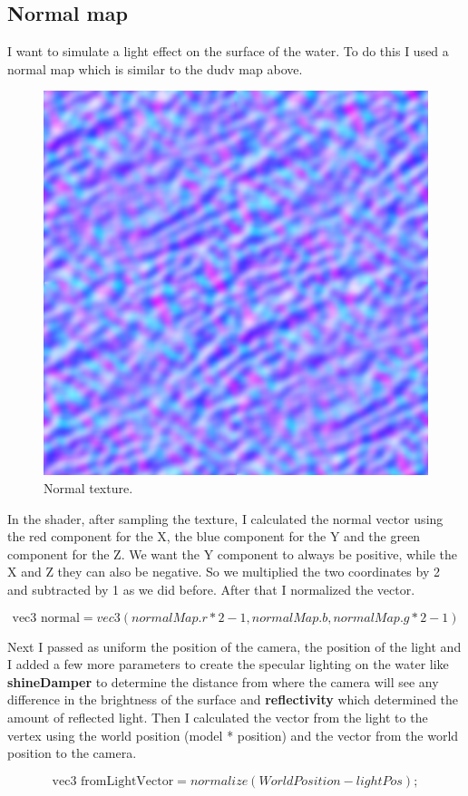 \subsection{Normal map}
I want to simulate a light effect on the surface of the water. To do this I used a normal map which is similar to the dudv map above. 

\newpage

\begin{figure}[hbt!]
	\centering
	\includegraphics[width= 0.5
	\textwidth]{../textures/plane/normalMap.png}
	\caption{Normal texture.}
\end{figure} 

\noindent
In the shader, after sampling the texture, I calculated the normal vector using the red component for the X, the blue component for the Y and the green component for the Z. We want the Y component to always be positive, while the X and Z they can also be negative. So we multiplied the two coordinates by 2 and subtracted by 1 as we did before. After that I normalized the vector.

\begin{equation}
\text{vec3 normal} = vec3(normalMap.r * 2 - 1, normalMap.b, normalMap.g * 2 - 1)		
\end{equation}

\noindent
Next I passed as uniform the position of the camera, the position of the light and I added a few more parameters to create the specular lighting on the water like \textbf{shineDamper} to determine the distance from where the camera will see any difference in the brightness of the surface and \textbf{reflectivity} which determined the amount of reflected light.
Then I calculated the vector from the light to the vertex using the world position (model * position) and the vector from the world position to the camera.

\begin{equation}
\text{vec3 fromLightVector} = normalize(WorldPosition - lightPos);
\end{equation}

